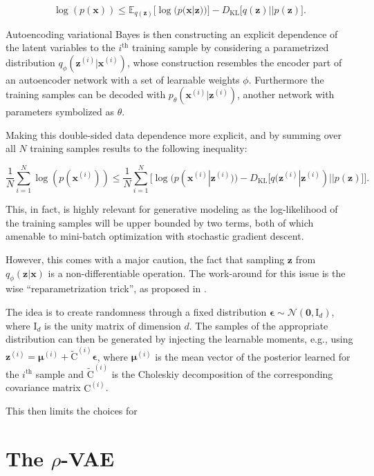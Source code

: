\documentclass{article}
\begin{document}
\begin{equation}
\log(p(\mathbf{x})) \leqslant \mathbb{E}_{q(\mathbf{z})} \Big[ \log(p(\mathbf{x}|\mathbf{z}))  \Big] - D_{\text{KL}}\Big[ q(\mathbf{z}) || p(\mathbf{z}) \Big].
\end{equation}

Autoencoding variational Bayes is then constructing an explicit dependence of the latent variables to the $i^{\text{th}}$ training sample by considering a parametrized distribution $q_{\phi}(\mathbf{z}^{(i)}|\mathbf{x}^{(i)})$, whose construction resembles the encoder part of an autoencoder network with a set of learnable weights $\phi$. Furthermore the training samples can be decoded with $p_{\theta}(\mathbf{x}^{(i)} | \mathbf{z}^{(i)})$, another network with parameters symbolized as $\theta$.

Making this double-sided data dependence more explicit, and by summing over all $N$ training samples results to the following inequality:


\begin{equation}
\frac{1}{N}\sum_{i=1}^N \log(p(\mathbf{x}^{(i)})) \leqslant \frac{1}{N} \sum_{i=1}^N \Big[ \log(p(\mathbf{x}^{(i)}|\mathbf{z}^{(i)}))   -  D_{\text{KL}}\big[ q(\mathbf{z}^{(i)}  | \mathbf{z}^{(i)}) || p(\mathbf{z}) \big] \Big].
\end{equation}

This, in fact, is highly relevant for generative modeling as the log-likelihood of the training samples will be upper bounded by two terms, both of which amenable to mini-batch optimization with stochastic gradient descent.

However, this comes with a major caution, the fact that sampling $\mathbf{z}$ from $q_{\phi}(\mathbf{z} | \mathbf{x})$ is a non-differentiable operation. The work-around for this issue is the wise ``reparametrization trick'', as proposed in \cite{VAE}. 

The idea is to create randomness through a fixed distribution $\boldsymbol{\epsilon} \sim \mathcal{N}(\mathbf{0}, \mathrm{I}_d)$, where $\mathrm{I}_d$ is the unity matrix of dimension $d$. The samples of the appropriate distribution can then be generated by injecting the learnable moments, e.g., using $\mathbf{z}^{(i)} = \boldsymbol{\mu}^{(i)} + \tilde{\mathrm{C}}^{(i)} \boldsymbol{\epsilon}$, where $\boldsymbol{\mu}^{(i)}$ is the mean vector of the posterior learned for the $i^{\text{th}}$ sample and $\tilde{\mathrm{C}}^{(i)}$ is the Choleskiy decomposition of the corresponding covariance matrix $\mathrm{C}^{(i)}$.

This then limits the choices for 


 
\section{The $\rho$-VAE}




\end{document}
